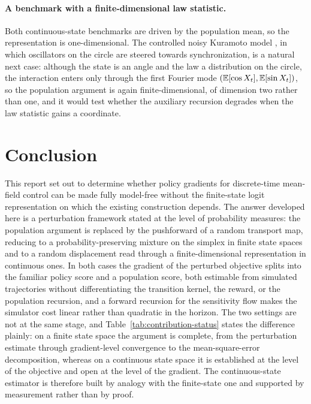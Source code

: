 \paragraph{A benchmark with a finite-dimensional law statistic.}
Both continuous-state benchmarks are driven by the population mean, so the representation is one-dimensional. The controlled noisy Kuramoto model \cite{sinigaglia_braghin_berman_kuramoto,chen_wang_zhidkova_kuramoto}, in which oscillators on the circle are steered towards synchronization, is a natural next case: although the state is an angle and the law a distribution on the circle, the interaction enters only through the first Fourier mode $(\mathbb{E}[\cos X_t],\mathbb{E}[\sin X_t])$, so the population argument is again finite-dimensional, of dimension two rather than one, and it would test whether the auxiliary recursion degrades when the law statistic gains a coordinate.

\section{Conclusion}

This report set out to determine whether policy gradients for discrete-time mean-field control can be made fully model-free without the finite-state logit representation on which the existing construction depends. The answer developed here is a perturbation framework stated at the level of probability measures: the population argument is replaced by the pushforward of a random transport map, reducing to a probability-preserving mixture on the simplex in finite state spaces and to a random displacement read through a finite-dimensional representation in continuous ones. In both cases the gradient of the perturbed objective splits into the familiar policy score and a population score, both estimable from simulated trajectories without differentiating the transition kernel, the reward, or the population recursion, and a forward recursion for the sensitivity flow makes the simulator cost linear rather than quadratic in the horizon. The two settings are not at the same stage, and Table~\ref{tab:contribution-status} states the difference plainly: on a finite state space the argument is complete, from the perturbation estimate through gradient-level convergence to the mean-square-error decomposition, whereas on a continuous state space it is established at the level of the objective and open at the level of the gradient. The continuous-state estimator is therefore built by analogy with the finite-state one and supported by measurement rather than by proof.

